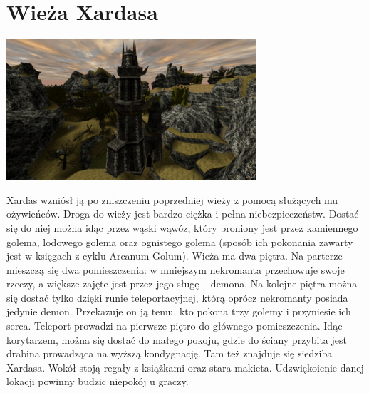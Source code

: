 \documentclass[11pt,polish, openany]{book}
\begin{document}
\section{Wieża Xardasa}
\begin{center}
 \includegraphics[scale=1.0]{wiezaxardasa.png}
\end{center}
Xardas wzniósł ją po zniszczeniu poprzedniej wieży z pomocą służących mu ożywieńców. Droga do wieży jest bardzo ciężka i pełna niebezpieczeństw. Dostać się do niej można idąc przez wąski wąwóz, który broniony jest przez kamiennego golema, lodowego golema oraz ognistego golema (sposób ich pokonania zawarty jest w księgach z cyklu Arcanum Golum). Wieża ma dwa piętra. Na parterze mieszczą się dwa pomieszczenia: w mniejszym nekromanta przechowuje swoje rzeczy, a większe zajęte jest przez jego sługę – demona. Na kolejne piętra można się dostać tylko dzięki runie teleportacyjnej, którą oprócz nekromanty posiada jedynie demon. Przekazuje on ją temu, kto pokona trzy golemy i przyniesie ich serca. Teleport prowadzi na pierwsze piętro do głównego pomieszczenia. Idąc korytarzem, można się dostać do małego pokoju, gdzie do ściany przybita jest drabina prowadząca na wyższą kondygnację. Tam też znajduje się siedziba Xardasa. Wokół stoją regały z książkami oraz stara makieta.
Udzwiękoienie danej lokacji powinny budzic niepokój u graczy.
\end{document}
